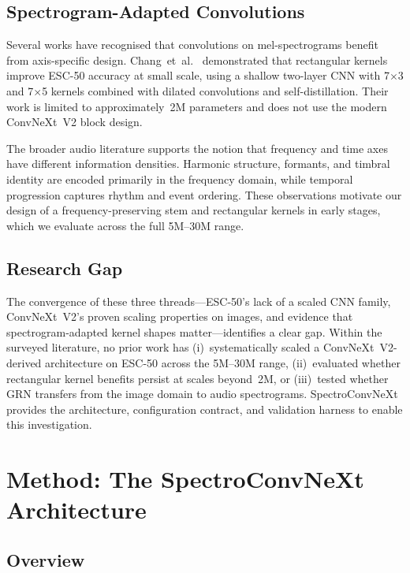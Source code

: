 \documentclass{article}
\begin{document}
\subsection{Spectrogram-Adapted Convolutions}

Several works have recognised that convolutions on mel-spectrograms benefit
from axis-specific design. Chang~et~al.~\cite{chang2026rectangular}
demonstrated that rectangular kernels improve ESC-50 accuracy at small scale,
using a shallow two-layer CNN with 7$\times$3 and 7$\times$5 kernels combined
with dilated convolutions and self-distillation. Their work is limited to
approximately~2M parameters and does not use the modern ConvNeXt~V2 block
design.

The broader audio literature supports the notion that frequency and time axes
have different information densities. Harmonic structure, formants, and timbral
identity are encoded primarily in the frequency domain, while temporal
progression captures rhythm and event ordering. These observations motivate our
design of a frequency-preserving stem and rectangular kernels in early stages,
which we evaluate across the full 5M--30M range.

\subsection{Research Gap}

The convergence of these three threads---ESC-50's lack of a scaled CNN family,
ConvNeXt~V2's proven scaling properties on images, and evidence that
spectrogram-adapted kernel shapes matter---identifies a clear gap. Within the
surveyed literature, no prior work has (i)~systematically scaled a
ConvNeXt~V2-derived architecture on ESC-50 across the 5M--30M range,
(ii)~evaluated whether rectangular kernel benefits persist at scales beyond~2M,
or (iii)~tested whether GRN transfers from the image domain to audio
spectrograms. SpectroConvNeXt provides the architecture, configuration contract,
and validation harness to enable this investigation.

\section{Method: The SpectroConvNeXt Architecture}

\subsection{Overview}
\end{document}
